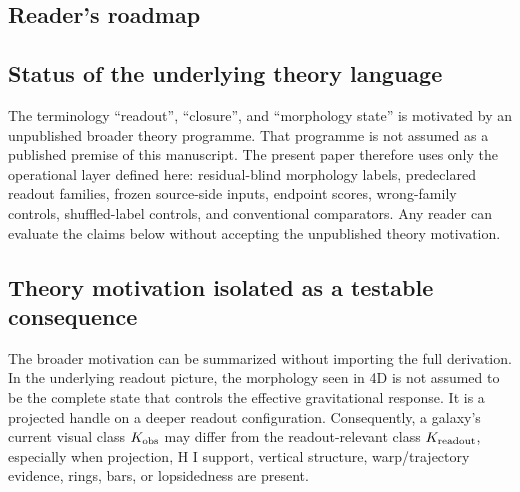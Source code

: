 \documentclass[11pt]{article}
\begin{document}
\subsection{Reader's roadmap}

\noindent{}

\subsection{Status of the underlying theory language}

The terminology ``readout'', ``closure'', and ``morphology state'' is motivated
by an unpublished broader theory programme.  That programme is not assumed as a
published premise of this manuscript.  The present paper therefore uses only
the operational layer defined here: residual-blind morphology labels,
predeclared readout families, frozen source-side inputs, endpoint scores,
wrong-family controls, shuffled-label controls, and conventional comparators.
Any reader can evaluate the claims below without accepting the unpublished
theory motivation.

\subsection{Theory motivation isolated as a testable consequence}

The broader motivation can be summarized without importing the full derivation.
In the underlying readout picture, the morphology seen in 4D is not assumed to
be the complete state that controls the effective gravitational response.  It is
a projected handle on a deeper readout configuration.  Consequently, a galaxy's
current visual class \(K_{\rm obs}\) may differ from the readout-relevant class
\(K_{\rm readout}\), especially when projection, H I support, vertical
structure, warp/trajectory evidence, rings, bars, or lopsidedness are present.
\end{document}
